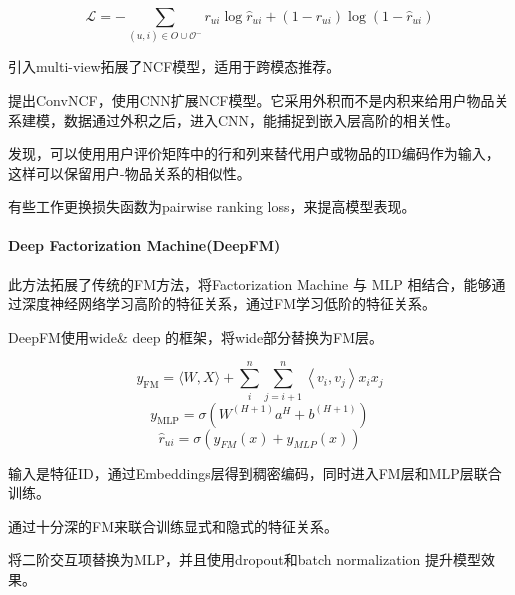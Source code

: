     \begin{equation}
\mathcal{L}=-\sum_{(u, i) \in O \cup \mathcal{O}^{-}} r_{u i} \log \hat{r}_{u i}+\left(1-r_{u i}\right) \log \left(1-\hat{r}_{u i}\right)
\end{equation}
    
    \cite{lian2017cccfnet}引入multi-view拓展了NCF模型，适用于跨模态推荐。
    
    \cite{he2018outer}提出ConvNCF，使用CNN扩展NCF模型。它采用外积而不是内积来给用户物品关系建模，数据通过外积之后，进入CNN，能捕捉到嵌入层高阶的相关性。
    
    \cite{zhang2018neurec}发现，可以使用用户评价矩阵中的行和列来替代用户或物品的ID编码作为输入，这样可以保留用户-物品关系的相似性。
    
    有些工作\cite{niu2018neural}更换损失函数为pairwise ranking loss，来提高模型表现。

   
\paragraph{Deep Factorization Machine(DeepFM)\cite{guo2017deepfm}}
此方法拓展了传统的FM方法，将Factorization Machine 与 MLP 相结合，能够通过深度神经网络学习高阶的特征关系，通过FM学习低阶的特征关系。

DeepFM使用wide\& deep \cite{cheng2016wide}的框架，将wide部分替换为FM层。

\begin{equation}
y_{\mathrm{FM}}=\langle W, X\rangle+\sum_{i}^{n} \sum_{j=i+1}^{n}\left\langle v_{i}, v_{j}\right\rangle x_{i} x_{j}
\end{equation}
\begin{equation}
y_{\mathrm{MLP}}=\sigma\left(W^{(H+1)} a^{H}+b^{(H+1)}\right)
\end{equation}
\begin{equation}
\hat{r}_{u i}=\sigma\left(y_{F M}(x)+y_{M L P}(x)\right)
\end{equation}

输入是特征ID，通过Embeddings层得到稠密编码，同时进入FM层和MLP层联合训练。

\cite{lian2018xdeepfm}通过十分深的FM来联合训练显式和隐式的特征关系。

\cite{he2017neural}将二阶交互项替换为MLP，并且使用dropout和batch normalization 提升模型效果。

